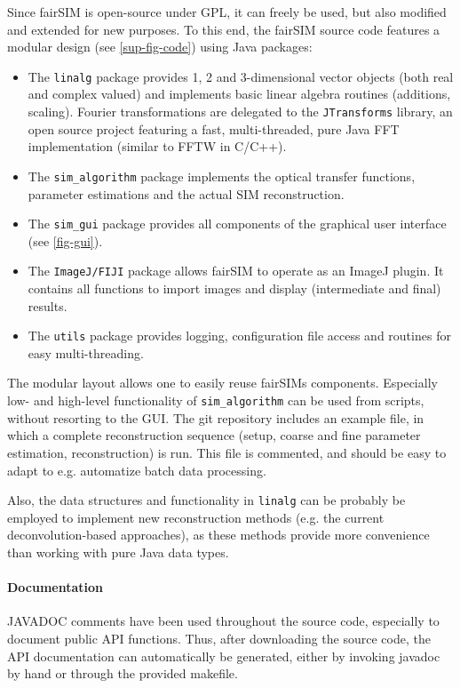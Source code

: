 \documentclass[twoside=false,
           twocolumn=false,
           a4paper,DIV=15,
           10pt]{scrartcl}
\begin{document}
Since fairSIM is open-source under GPL, it can freely be used,
but also modified and extended for new purposes. To this end,
the fairSIM source code features a modular design (see \cref{sup-fig-code})
using Java packages:

\begin{itemize}
\item  The \verb+linalg+ package provides 1, 2 and 3-dimensional
vector objects (both real and complex valued) and implements basic
linear algebra routines (additions, scaling). Fourier transformations
are delegated to the \verb+JTransforms+ library, an open source
project featuring a fast, multi-threaded, pure Java 
FFT implementation (similar to FFTW in C/C++).
\item The \verb+sim_algorithm+ package implements the optical transfer
functions, parameter estimations and the actual SIM reconstruction.
\item The \verb+sim_gui+ package provides all components of the graphical 
user interface (see \cref{fig-gui}).
\item The \verb+ImageJ/FIJI+ package allows fairSIM to operate as an
ImageJ plugin. It contains all functions to import images and display
(intermediate and final) results.
\item The \verb+utils+ package provides logging, configuration
file access and routines for easy multi-threading.
\end{itemize}

The modular layout allows one to easily reuse fairSIMs components.
Especially low- and high-level functionality of \verb+sim_algorithm+ can be
used from scripts, without resorting to the GUI. The git repository includes
an example file, in which a complete reconstruction sequence (setup, coarse and fine
parameter estimation, reconstruction) is run. This file is commented, and
should be easy to adapt to e.g. automatize batch data processing.

Also, the data structures and functionality in \verb+linalg+ can be 
probably be employed to implement new reconstruction methods (e.g. the
current deconvolution-based approaches), as these methods provide more 
convenience than working with pure Java data types.

\paragraph{Documentation}
JAVADOC comments have been used throughout the source code, especially to document
public API functions. Thus, after downloading the source code, the API documentation
can automatically be generated, either by invoking javadoc by hand or through
the provided makefile.
\end{document}

